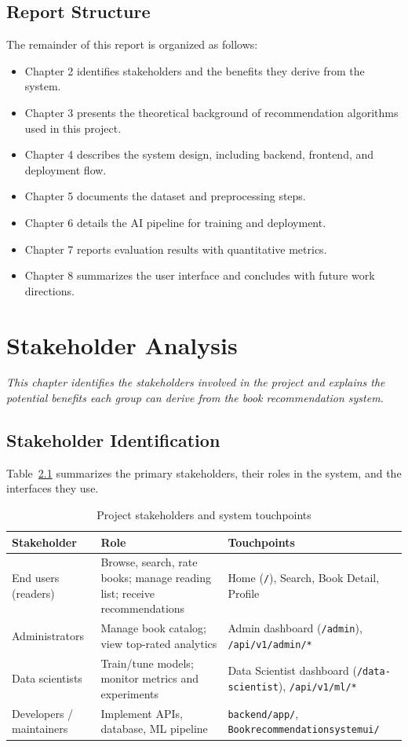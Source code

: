 \documentclass[12pt,a4paper]{report}
\newcommand{\chapterdesc}[1]{%
    \vspace{-0.6\baselineskip}
    \noindent\hspace*{1.5cm}\parbox{\dimexpr\textwidth-1.5cm\relax}{\textit{#1}}
    \par\vspace{0.3\baselineskip}
}
\begin{document}
\section{Report Structure}
The remainder of this report is organized as follows:
\begin{itemize}
    \item Chapter 2 identifies stakeholders and the benefits they derive from the system.
    \item Chapter 3 presents the theoretical background of recommendation algorithms used in this project.
    \item Chapter 4 describes the system design, including backend, frontend, and deployment flow.
    \item Chapter 5 documents the dataset and preprocessing steps.
    \item Chapter 6 details the AI pipeline for training and deployment.
    \item Chapter 7 reports evaluation results with quantitative metrics.
    \item Chapter 8 summarizes the user interface and concludes with future work directions.
\end{itemize}

\chapter{Stakeholder Analysis}
\chapterdesc{This chapter identifies the stakeholders involved in the project and explains the potential benefits each group can derive from the book recommendation system.}

\section{Stakeholder Identification}

Table~\ref{tab:stakeholders} summarizes the primary stakeholders, their roles in the system, and the interfaces they use.

\begin{table}[htbp]
\centering
\caption{Project stakeholders and system touchpoints}
\label{tab:stakeholders}
\begingroup
\renewcommand{\arraystretch}{1.25}
\setlength{\tabcolsep}{8pt}
\begin{tabular}{@{}p{3.2cm}p{4.2cm}p{6.6cm}@{}}
\toprule
\textbf{Stakeholder} & \textbf{Role} & \textbf{Touchpoints} \\
\midrule
End users (readers) &
Browse, search, rate books; manage reading list; receive recommendations &
Home (\texttt{/}), Search, Book Detail, Profile \\
Administrators &
Manage book catalog; view top-rated analytics &
Admin dashboard (\texttt{/admin}), \texttt{/api/v1/admin/*} \\
Data scientists &
Train/tune models; monitor metrics and experiments &
Data Scientist dashboard (\texttt{/data-scientist}), \texttt{/api/v1/ml/*} \\
Developers / maintainers &
Implement APIs, database, ML pipeline &
\texttt{backend/app/}, \texttt{Bookrecommendationsystemui/} \\
\bottomrule
\end{tabular}
\endgroup
\end{table}
\end{document}
